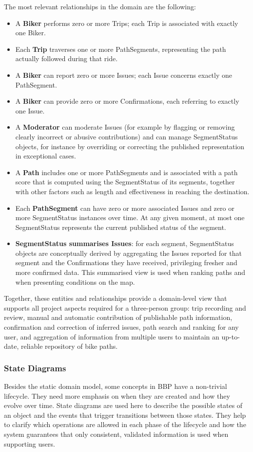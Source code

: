 The most relevant relationships in the domain are the following:
\begin{itemize}
    \item A \textbf{Biker} performs zero or more Trips; each Trip is associated with exactly one Biker.
    \item Each \textbf{Trip} traverses one or more PathSegments, representing the path actually followed during that ride.
    \item A \textbf{Biker} can report zero or more Issues; each Issue concerns exactly one PathSegment.
    \item A \textbf{Biker} can provide zero or more Confirmations, each referring to exactly one Issue.
    \item A \textbf{Moderator} can moderate Issues (for example by flagging or removing clearly incorrect or abusive contributions) and can manage SegmentStatus objects, for instance by overriding or correcting the published representation in exceptional cases.
    \item A \textbf{Path} includes one or more PathSegments and is associated with a path score that is computed using the SegmentStatus of its segments, together with other factors such as length and effectiveness in reaching the destination.
    \item Each \textbf{PathSegment} can have zero or more associated Issues and zero or more SegmentStatus instances over time.
          At any given moment, at most one SegmentStatus represents the current published status of the segment.
    \item \textbf{SegmentStatus summarises Issues}: for each segment, SegmentStatus objects are conceptually derived by aggregating the Issues reported for that segment and the Confirmations they have received, privileging fresher and more confirmed data.
          This summarised view is used when ranking paths and when presenting conditions on the map.
\end{itemize}

Together, these entities and relationships provide a domain-level view that supports all project aspects required for a three-person group:
trip recording and review, manual and automatic contribution of publishable path information, confirmation and correction of inferred issues, path search and ranking for any user, and aggregation of information from multiple users to maintain an up-to-date, reliable repository of bike paths.

\subsubsection{State Diagrams}
Besides the static domain model, some concepts in BBP have a non-trivial lifecycle. They need more emphasis on when they are created and how they evolve over time. State diagrams are used here to describe the possible states of an object and the events that trigger transitions between those states. They help to clarify which operations are allowed in each phase of the lifecycle and how the system guarantees that only consistent, validated information is used when supporting users.

